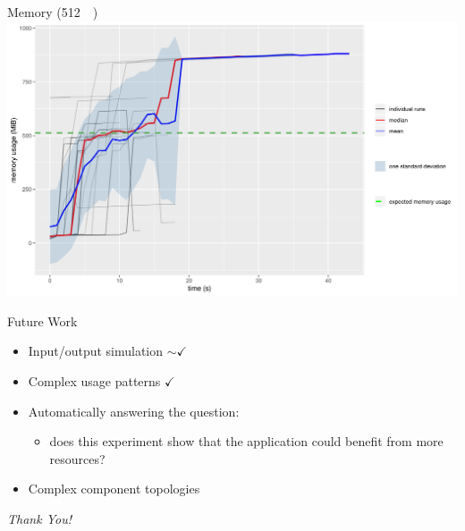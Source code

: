 \documentclass{beamer}
\begin{document}
\begin{frame}{Memory (\SI{512}{\mebi\byte})}
  \includegraphics[width=\textwidth]{../../plots/heap_512.png}
\end{frame}


\begin{frame}{Future Work}
  \begin{itemize}
  \item Input/output simulation \textcolor{mygreen}{$\sim\checkmark$}
  \item Complex usage patterns \textcolor{mygreen}{$\checkmark$}
  \item Automatically answering the question:
    \begin{itemize}
    \item does this experiment show that the application could benefit from more
      resources?
    \end{itemize}
  \item Complex component topologies
  \end{itemize}
  \pause
  \vfill
  \centering
  \large
  \emph{Thank You!}
\end{frame}

\end{document}
